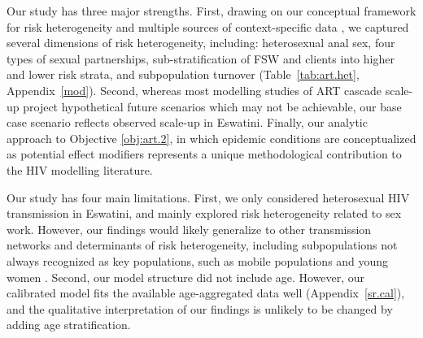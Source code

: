 Our study has three major strengths.
First, drawing on our conceptual framework for risk heterogeneity \cite[Table~1]{Knight2022sr}
and multiple sources of context-specific data
\cite{SDHS2006,SHIMS1,SHIMS2,Baral2014,EswKP2014,EswIBBS2022},
we captured several dimensions of risk heterogeneity, including:
heterosexual anal sex,
four types of sexual partnerships,
sub-stratification of FSW and clients into higher and lower risk strata,
and subpopulation turnover
(Table~\ref{tab:art.het}, Appendix~\ref{mod}).
Second, whereas most modelling studies of ART cascade scale-up
project hypothetical future scenarios which may not be achievable,
our base case scenario reflects observed scale-up in Eswatini.
Finally, our analytic approach to Objective \ref{obj:art.2},
in which epidemic conditions are conceptualized as potential effect modifiers
represents a unique methodological contribution to the HIV modelling literature.
\par
Our study has four main limitations.
First, we only considered heterosexual HIV transmission in Eswatini,
and mainly explored risk heterogeneity related to sex work.
However, our findings would likely generalize
to other transmission networks and determinants of risk heterogeneity,
including subpopulations not always recognized as key populations,
such as mobile populations and young women \cite{Camlin2019,Cheuk2020}.
Second, our model structure did not include age.
However, our calibrated model fits
the available age-aggregated data well (Appendix~\ref{sr.cal}),
and the qualitative interpretation of our findings
is unlikely to be changed by adding age stratification.
